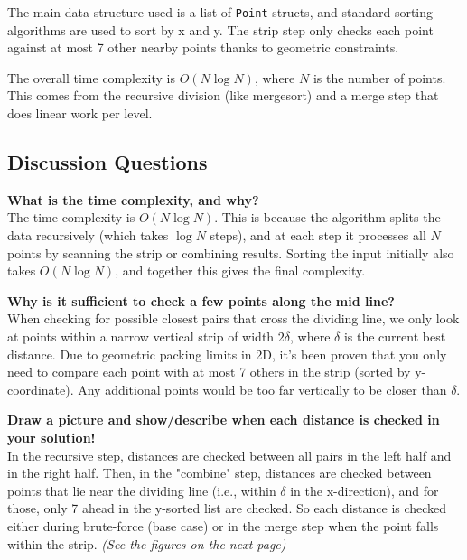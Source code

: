 \documentclass{article}
\begin{document}
The main data structure used is a list of \texttt{Point} structs, and standard sorting algorithms are used to sort by x and y. The strip step only checks each point against at most 7 other nearby points thanks to geometric constraints.

The overall time complexity is \( O(N \log N) \), where \( N \) is the number of points. This comes from the recursive division (like mergesort) and a merge step that does linear work per level.

\subsection*{Discussion Questions}

\textbf{What is the time complexity, and why?} \\
The time complexity is \( O(N \log N) \). This is because the algorithm splits the data recursively (which takes \( \log N \) steps), and at each step it processes all \( N \) points by scanning the strip or combining results. Sorting the input initially also takes \( O(N \log N) \), and together this gives the final complexity.

\vspace{1em}
\textbf{Why is it sufficient to check a few points along the mid line?} \\
When checking for possible closest pairs that cross the dividing line, we only look at points within a narrow vertical strip of width \( 2\delta \), where \( \delta \) is the current best distance. Due to geometric packing limits in 2D, it's been proven that you only need to compare each point with at most 7 others in the strip (sorted by y-coordinate). Any additional points would be too far vertically to be closer than \( \delta \).

\vspace{1em}
\textbf{Draw a picture and show/describe when each distance is checked in your solution!} \\
In the recursive step, distances are checked between all pairs in the left half and in the right half. Then, in the "combine" step, distances are checked between points that lie near the dividing line (i.e., within \( \delta \) in the x-direction), and for those, only 7 ahead in the y-sorted list are checked. So each distance is checked either during brute-force (base case) or in the merge step when the point falls within the strip. \textit{(See the figures on the next page)}
\end{document}
